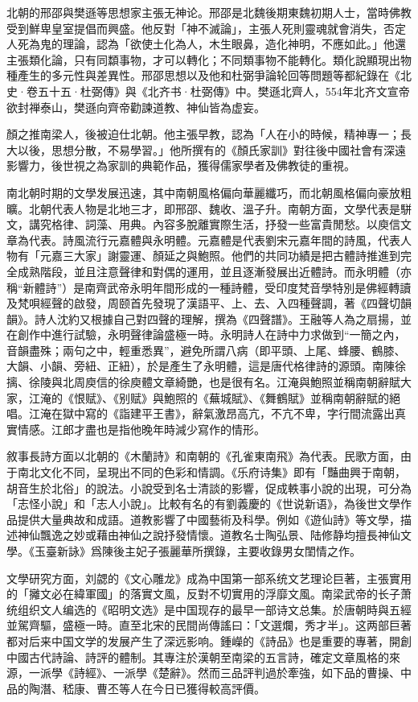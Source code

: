北朝的邢邵與樊遜等思想家主張无神论。邢邵是北魏後期東魏初期人士，當時佛教受到鮮卑皇室提倡而興盛。他反對「神不滅論」，主張人死則靈魂就會消失，否定人死為鬼的理論，認為「欲使土化為人，木生眼鼻，造化神明，不應如此。」他還主張類化論，只有同纇事物，才可以轉化；不同類事物不能轉化。類化說顯現出物種產生的多元性與差異性。邢邵思想以及他和杜弼爭論轮回等問題等都紀錄在《北史·卷五十五·杜弼傳》與《北齐书·杜弼傳》中。樊遜北齊人，554年北齐文宣帝欲封禅泰山，樊遜向齊帝勸諫道教、神仙皆為虚妄。

顏之推南梁人，後被迫仕北朝。他主張早教，認為「人在小的時候，精神專一；長大以後，思想分散，不易學習。」他所撰有的《顏氏家訓》對往後中國社會有深遠影響力，後世視之為家訓的典範作品，獲得儒家學者及佛教徒的重視。

南北朝时期的文學发展迅速，其中南朝風格偏向華麗纖巧，而北朝風格偏向豪放粗曠。北朝代表人物是北地三才，即邢邵、魏收、溫子升。南朝方面，文學代表是駢文，講究格律、詞藻、用典。內容多脫離實際生活，抒發一些富貴閒愁。以庾信文章為代表。詩風流行元嘉體與永明體。元嘉體是代表劉宋元嘉年間的詩風，代表人物有「元嘉三大家」謝靈運、顏延之與鮑照。他們的共同功績是把古體詩推進到完全成熟階段，並且注意聲律和對偶的運用，並且逐漸發展出近體詩。而永明體（亦稱“新體詩”）是南齊武帝永明年間形成的一種詩體，受印度梵音學特別是佛經轉讀及梵唄經聲的啟發，周颐首先發現了漢語平、上、去、入四種聲調，著《四聲切韻韻》。詩人沈約又根據自己對四聲的理解，撰為《四聲譜》。王融等人為之扇揚，並在創作中進行試驗，永明聲律論盛極一時。永明詩人在詩中力求做到“一簡之內，音韻盡殊；兩句之中，輕重悉異”，避免所謂八病（即平頭、上尾、蜂腰、鶴膝、大韻、小韻、旁紐、正紐），於是產生了永明體，這是唐代格律詩的源頭。南陳徐摛、徐陵與北周庾信的徐庾體文章綺艷，也是很有名。江淹與鮑照並稱南朝辭賦大家，江淹的《恨赋》、《别赋》與鮑照的《蕪城賦》、《舞鶴賦》並稱南朝辭賦的絕唱。江淹在獄中寫的《詣建平王書》，辭氣激昂高亢，不亢不卑，字行間流露出真實情感。江郎才盡也是指他晚年時減少寫作的情形。

敘事長詩方面以北朝的《木蘭詩》和南朝的《孔雀東南飛》為代表。民歌方面，由于南北文化不同，呈現出不同的色彩和情調。《乐府诗集》即有「豔曲興于南朝，胡音生於北俗」的說法。小說受到名士清談的影響，促成軼事小說的出現，可分為「志怪小說」和「志人小說」。比較有名的有劉義慶的《世说新语》，為後世文學作品提供大量典故和成語。道教影響了中國藝術及科學。例如《遊仙詩》等文學，描述神仙飄逸之妙或藉由神仙之說抒發情懷。道教名士陶弘景、陆修静均擅長神仙文學。《玉臺新詠》爲陳後主妃子張麗華所撰錄，主要收錄男女閨情之作。

文學研究方面，刘勰的《文心雕龙》成為中国第一部系统文艺理论巨著，主張實用的「攡文必在緯軍國」的落實文風，反對不切實用的浮靡文風。南梁武帝的长子萧统组织文人编选的《昭明文选》是中国现存的最早一部诗文总集。於唐朝時與五經並駕齊驅，盛極一時。直至北宋的民間尚傳謠曰：「文選爛，秀才半」。这两部巨著都对后来中国文学的发展产生了深远影响。鍾嶸的《詩品》也是重要的專著，開創中國古代詩論、詩評的體制。其專注於漢朝至南梁的五言詩，確定文章風格的來源，一派學《詩經》、一派學《楚辭》。然而三品評判過於牽強，如下品的曹操、中品的陶潛、嵇康、曹丕等人在今日已獲得較高評價。

